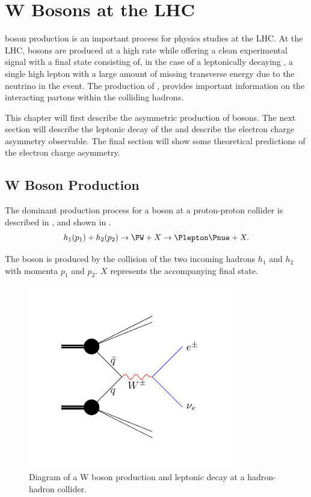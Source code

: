 \chapter[W Bosons]{W Bosons at the LHC}
\label{chap:wboson}

\PW boson production is an important process for physics studies at the LHC.  At
the {LHC}, \PW bosons are produced at a high rate while offering a clean
experimental signal with a final state consisting of, in the case of a
leptonically decaying \PW, a single high \PT lepton with a large amount of
missing transverse energy due to the neutrino in the event. 
The production of \PW, provides important
information on the interacting partons within the colliding
hadrons\cite{catani}.

This chapter will first describe the asymmetric production of \PW bosons.
The next section will describe the leptonic decay of the \PW and describe the electron
charge asymmetry observable. The final section will show some theoretical
predictions of the electron charge asymmetry.

\section{W Boson Production}

The dominant production process for a \PW boson at a proton-proton collider is
described in ,
and shown in . 
\begin{equation}
  h_1(p_1) + h_2(p_2)
  \to 
  \PW + X
  \to
  \Plepton \Pnue + X.
  \label{wbos:wprod}
\end{equation}

The \PW boson is produced by the collision of the two incoming hadrons $h_1$ and
$h_2$ with momenta $p_1$ and $p_2$.  $X$ represents the accompanying final
state.

\begin{figure}[htbp]
  \centering
  \includegraphics[width=0.8\textwidth]{w_production}
  \caption{Diagram of a W boson production and leptonic decay at a hadron-hadron collider.}
  \label{wbos:wproddiag}
\end{figure}


